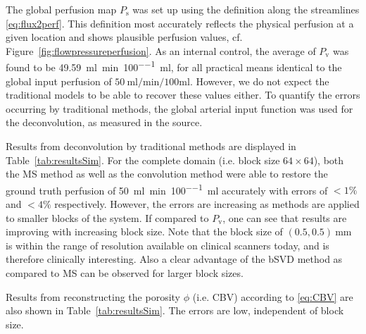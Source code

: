 \documentclass[journal,twocolumn]{IEEEtran}
\newcommand{\Perfv}{P_{\mathrm{v}}}
\newcommand{\Perfs}{P_{\mathrm{s}}}
\newcommand{\siPml}{\milli\litre\per\minute\per100\milli\litre}
\begin{document}
	The global perfusion map $\Perfs$ was set up using the definition along the streamlines \eqref{eq:flux2perf}.
	This definition most accurately reflects the physical perfusion at a given location and shows plausible perfusion values, cf. Figure~\ref{fig:flowpressureperfusion}. As an internal control, the average of $\Perfv$ was found to be \SI{49.59}{\siPml}, for all practical means identical to the global input perfusion of $\SI{50}{\siPml}$.
	However, we do not expect the traditional models to be able to recover these values either.
	To quantify the errors occurring by traditional methods, the global arterial input function was used for the deconvolution, as measured in the source.
	
	Results from deconvolution by traditional methods are displayed in Table~\ref{tab:resultsSim}. 
	For the complete domain (i.e. block size $64 \times 64$), both the MS method as well as the convolution method were able to restore the ground truth perfusion of \SI{50}{\siPml} accurately with errors of $<1\%$ and $<4\%$ respectively.
	However, the errors are increasing as methods are applied to smaller blocks of the system.
	If compared to $\Perfv$, one can see that results are improving with increasing block size. 
	Note that the block size of $(0.5,0.5)\SI{}{\milli\meter}$ is within the range of resolution available on clinical scanners today, and is therefore clinically interesting.
	Also a clear advantage of the bSVD method as compared to MS can be observed for larger block sizes.
		
	Results from reconstructing the porosity $\phi$ (i.e. CBV) according to \eqref{eq:CBV} are also shown in Table~\ref{tab:resultsSim}. The errors are low, independent of block size.
	
\end{document}

